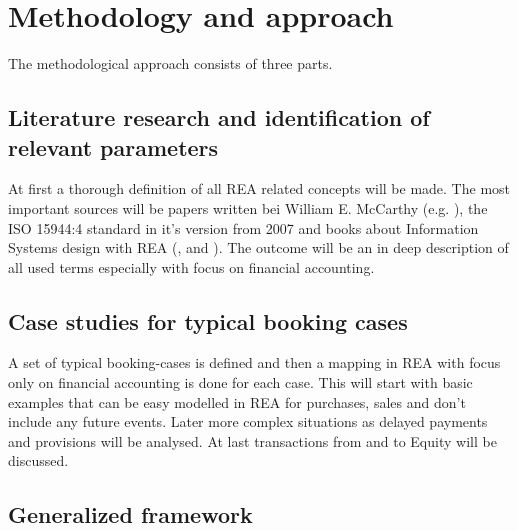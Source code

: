 



\section*{Methodology and approach}

The methodological approach consists of three parts.

\subsection*{Literature research and identification of relevant parameters}

At first a thorough definition of all REA related concepts will be made. The most important sources will be papers written bei William E. McCarthy (e.g. \cite{mccarthy1982rea}), the ISO 15944:4 standard in it's version from 2007 \cite{ISOIEC1594442007} and books about Information Systems design with REA (\cite{dunn2005enterpriseinfosys}, \cite{hruby2006modeldrivendesign} and \cite{hollander2000accounting}). The outcome will be an in deep description of all used terms especially with focus on financial accounting.

\subsection*{ Case studies for typical booking cases}

A set of typical booking-cases is defined and then a mapping in REA with focus only on financial accounting is done for each case.
This will start with basic examples that can be easy modelled in REA for purchases, sales and don't include any future events.
Later more complex situations as delayed payments and provisions will be analysed.
At last transactions from and to Equity will be discussed.

\subsection*{ Generalized framework}

